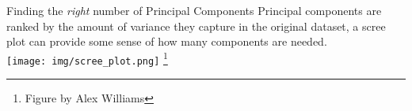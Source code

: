 \documentclass[aspectratio=169,notes]{beamer}
\newcommand\blfootnote[1]{%
  \begingroup
  \renewcommand\thefootnote{}\footnote{#1}%
  \addtocounter{footnote}{-1}%
  \endgroup
}
\begin{document}
	\begin{frame}{Finding the \textit{right} number of Principal Components}
	Principal components are ranked by the amount of variance they capture in the original dataset, a scree plot can provide some sense of how many components are needed.\\
	\leavevmode\newline
	\centering
	\texttt{[image: img/scree\_plot.png]}
	\blfootnote{Figure by Alex Williams} %
	\end{frame}





\end{document}
